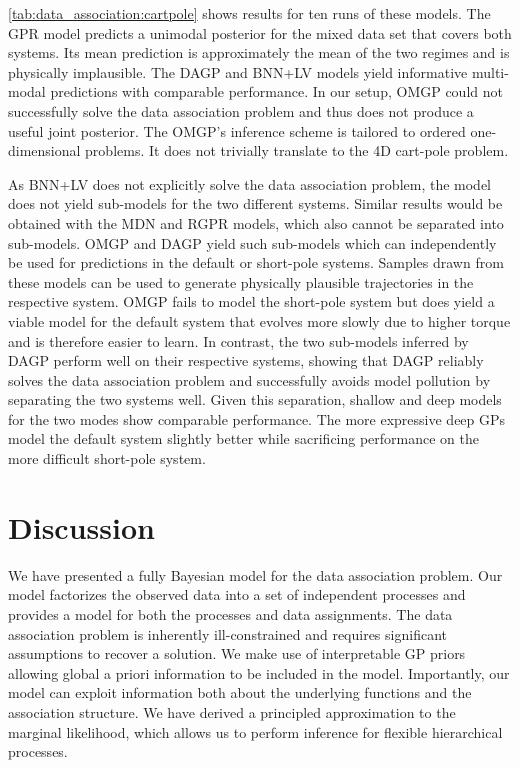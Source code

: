 \cref{tab:data_association:cartpole} shows results for ten runs of these models.
The GPR model predicts a unimodal posterior for the mixed data set that covers both systems.
Its mean prediction is approximately the mean of the two regimes and is physically implausible.
The DAGP and BNN+LV models yield informative multi-modal predictions with comparable performance.
In our setup, OMGP could not successfully solve the data association problem and thus does not produce a useful joint posterior.
The OMGP's inference scheme is tailored to ordered one-dimensional problems.
It does not trivially translate to the 4D cart-pole problem.

As BNN+LV does not explicitly solve the data association problem, the model does not yield sub-models for the two different systems.
Similar results would be obtained with the MDN and RGPR models, which also cannot be separated into sub-models.
OMGP and DAGP yield such sub-models which can independently be used for predictions in the default or short-pole systems.
Samples drawn from these models can be used to generate physically plausible trajectories in the respective system.
OMGP fails to model the short-pole system but does yield a viable model for the default system that evolves more slowly due to higher torque and is therefore easier to learn.
In contrast, the two sub-models inferred by DAGP perform well on their respective systems, showing that DAGP reliably solves the data association problem and successfully avoids model pollution by separating the two systems well.
Given this separation, shallow and deep models for the two modes show comparable performance.
The more expressive deep GPs model the default system slightly better while sacrificing performance on the more difficult short-pole system.


\section{Discussion}
\label{toc:data_association:conclusion}
We have presented a fully Bayesian model for the data association problem.
Our model factorizes the observed data into a set of independent processes and provides a model for both the processes and data assignments.
The data association problem is inherently ill-constrained and requires significant assumptions to recover a solution.
We make use of interpretable GP priors allowing global a priori information to be included in the model.
Importantly, our model can exploit information both about the underlying functions and the association structure.
We have derived a principled approximation to the marginal likelihood, which allows us to perform inference for flexible hierarchical processes.

